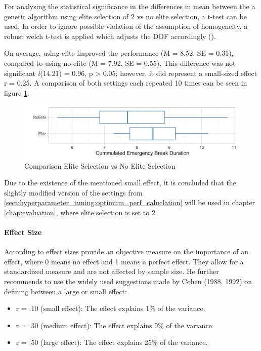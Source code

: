 For analysing the statistical significance in the differences in mean between the a genetic algorithm using elite selection of 2 vs no elite selection, a t-test can be used. In order to ignore possible violation of the assumption of homogeneity, a robust welch t-test is applied which adjusts the DOF accordingly (\cite{field_discovering_2012}).

On average, using elite improved the performance (M = 8.52, SE = 0.31), compared to using no elite (M = 7.92, SE = 0.55). This difference was not significant \textit{t}(14.21) = 0.96, p > 0.05; however, it did represent a small-sized effect r = 0.25. A comparison of both settings each repeated 10 times can be seen in figure \ref{fig:hyperparameter_tuning:elite_comparison}.

\begin{figure}[ht] 
	\label{fig:hyperparameter_tuning:elite_comparison}
	\includegraphics[width=1\linewidth]{simulations/evaluation/plots/elite_vs_no_elite}
	\caption{Comparison Elite Selection vs No Elite Selection}
\end{figure}

Due to the existence of the mentioned small effect, it is concluded that the slightly modified version of the settings from \ref{sect:hyperparameter_tuning:optimum_perf_caluclation} will be used in chapter \ref{chap:evaluation}, where elite selection is set to 2.

\paragraph{Effect Size}
According to \cite{field_discovering_2012} effect sizes provide an objective measure on the importance of an effect, where 0 means no effect and 1 means a perfect effect. They allow for a standardized measure and are not affected by sample size. He further recommends to use the widely used suggestions made by Cohen (1988, 1992)  on defining between a large or small effect:
\begin{itemize}
	\item r = .10 (small effect): The effect explains 1\% of the variance. 
	\item r = .30 (medium effect): The effect explains 9\% of the variance. 
	\item r = .50 (large effect): The effect explains 25\% of the variance.
\end{itemize} 

